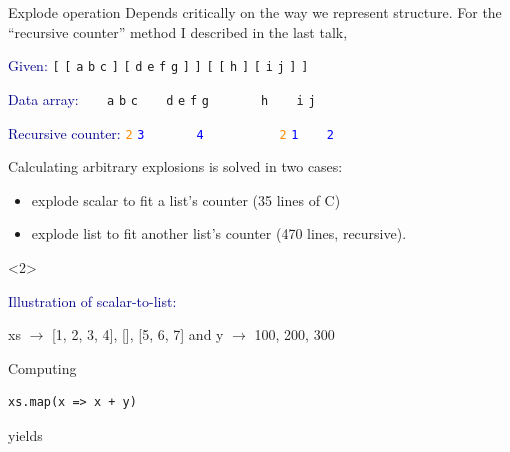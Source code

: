 \documentclass{beamer}
\begin{document}
\begin{frame}[fragile]{Explode operation}
\vspace{0.3 cm}
Depends critically on the way we represent structure. For the ``recursive counter'' method I described in the last talk,

\vspace{0.3 cm}
\textcolor{darkblue}{Given:} \hfill {\tt [} {\tt [} {\tt a} {\tt b} {\tt c} {\tt ]} {\tt [} {\tt d} {\tt e} {\tt f} {\tt g} {\tt ]} {\tt ]} {\tt [} {\tt [} {\tt h} {\tt ]} {\tt [} {\tt i} {\tt j} {\tt ]} {\tt ]}

\textcolor{darkblue}{Data array:} \hfill {\tt \ } {\tt \ } {\tt a} {\tt b} {\tt c} {\tt \ } {\tt \ } {\tt d} {\tt e} {\tt f} {\tt g} {\tt \ } {\tt \ } {\tt \ } {\tt \ } {\tt h} {\tt \ } {\tt \ } {\tt i} {\tt j} {\tt \ } {\tt \ }

\textcolor{darkblue}{Recursive counter:} \hfill \textcolor{darkorange}{\tt 2} \textcolor{blue}{\tt 3} {\tt \ } {\tt \ } {\tt \ } {\tt \ } \textcolor{blue}{\tt 4} {\tt \ } {\tt \ } {\tt \ } {\tt \ } {\tt \ } {\tt \ } \textcolor{darkorange}{\tt 2} \textcolor{blue}{\tt 1} {\tt \ } {\tt \ } \textcolor{blue}{\tt 2} {\tt \ } {\tt \ } {\tt \ } {\tt \ }

\vspace{0.3 cm}
Calculating arbitrary explosions is solved in two cases:
\begin{itemize}
\item explode scalar to fit a list's counter (35 lines of C)
\item explode list to fit another list's counter (470 lines, recursive).
\end{itemize}

\vspace{-0.3 cm}
\begin{onlyenv}<2>
\begin{center}
\begin{minipage}{0.8\linewidth}
\scriptsize
\vspace{0.3 cm}
\textcolor{darkblue}{Illustration of scalar-to-list:}

\vspace{0.2 cm}
xs $\to$ [1, 2, 3, 4], [], [5, 6, 7] and y $\to$ 100, 200, 300

\vspace{0.2 cm}
Computing
\begin{verbatim}
xs.map(x => x + y)
\end{verbatim}

yields


\end{minipage}
\end{center}
\end{onlyenv}
\end{frame}
\end{document}
